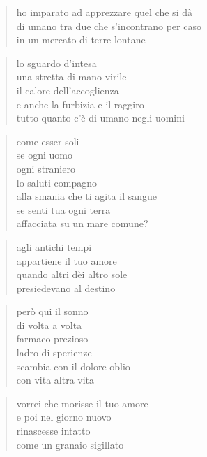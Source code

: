 	\begin{verse}
		ho imparato ad apprezzare quel che si dà\\
		di umano tra due che s’incontrano per caso\\
		in un mercato di terre lontane
	\end{verse}

	\begin{verse}
		lo sguardo d’intesa\\
		una stretta di mano virile\\
		il calore dell’accoglienza\\
		e anche la furbizia e il raggiro\\
		tutto quanto c’è di umano negli uomini
	\end{verse}

	\begin{verse}
		come esser soli\\
		se ogni uomo\\
		ogni straniero\\
		lo saluti compagno\\
		alla smania che ti agita il sangue\\
		se senti tua ogni terra\\
		affacciata su un mare comune?
	\end{verse}


\clearpage



	\begin{verse}
                agli antichi tempi\\
                appartiene il tuo amore\\
                quando altri dèi altro sole\\
                presiedevano al destino
	\end{verse}

	\begin{verse}
                però qui il sonno\\
                di volta a volta\\
                farmaco prezioso\\
                ladro di sperienze\\
                scambia con il dolore oblio\\
                con vita altra vita
	\end{verse}

	\begin{verse}
                vorrei che morisse il tuo amore\\
                e poi nel giorno nuovo\\
                rinascesse intatto\\
                come un granaio sigillato
	\end{verse}

